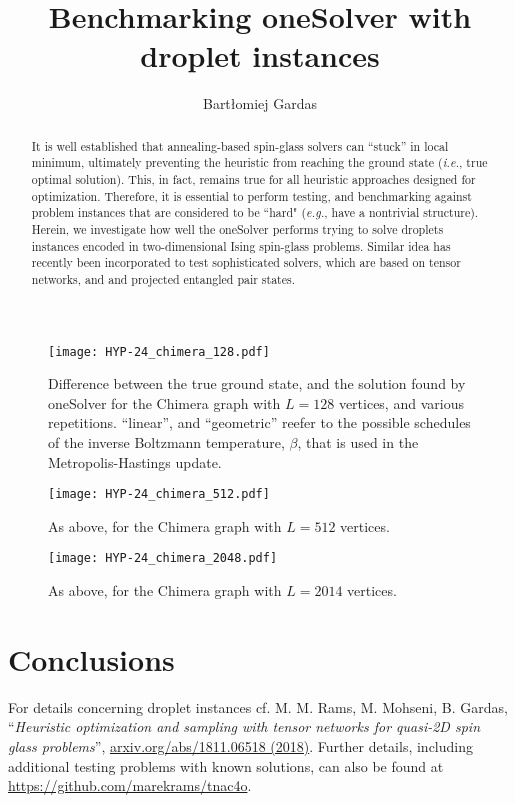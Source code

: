 \documentclass[]{report}
\title{Benchmarking oneSolver with droplet instances}
\author{Bart\l{}omiej Gardas}
\begin{document}
\maketitle

\begin{abstract}
It is well established that annealing-based spin-glass solvers can ``stuck'' in local minimum, ultimately preventing 
the heuristic from reaching the ground state (\emph{i.e.}, true optimal solution). This, in fact, remains true for all heuristic 
approaches designed for optimization. Therefore, it is essential to perform testing, and benchmarking against problem
instances that are considered to be ``hard" (\emph{e.g.}, have a nontrivial structure). Herein, we investigate how well
the oneSolver performs trying to solve droplets instances encoded in two-dimensional Ising spin-glass problems. 
Similar idea has recently been incorporated to test sophisticated solvers, which are based on tensor networks, and 
and projected entangled pair states.
\end{abstract}

\begin{figure}[h!]
	\texttt{[image: HYP-24\_chimera\_128.pdf]}
	\caption{
	Difference between the true ground state, and the solution found by oneSolver for the Chimera graph with $L=128$ vertices, and
	various repetitions. ``linear'', and ``geometric'' reefer to the possible schedules of the inverse Boltzmann temperature, $\beta$,  
	that is used in the Metropolis-Hastings update.}
	\label{fig1}
\end{figure}
%
\begin{figure}[h!]
	\texttt{[image: HYP-24\_chimera\_512.pdf]}
	\caption{As above, for the Chimera graph with $L=512$ vertices.}
	\label{fig2}
\end{figure}
%
\begin{figure}[h!]
	\texttt{[image: HYP-24\_chimera\_2048.pdf]} 
	\caption{As above, for the Chimera graph with $L=2014$ vertices.}
	\label{fig3}
\end{figure}

\newpage

\section{Conclusions}

For details concerning droplet instances cf.
M. M. Rams, M. Mohseni, B. Gardas,  ``\emph{Heuristic optimization and sampling with tensor networks for quasi-2D spin glass problems}'', 
\href{https://arxiv.org/abs/1811.06518}{arxiv.org/abs/1811.06518 (2018)}. Further details, including additional testing problems with known solutions, 
can also be found at \href{https://github.com/marekrams/tnac4o}{https://github.com/marekrams/tnac4o}.
\end{document}
